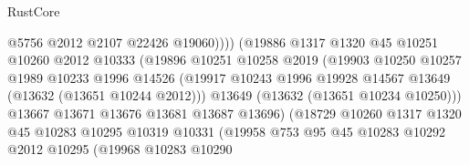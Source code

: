 \begin{lexlean}{RustCore}
\begin{coremodule}
                                        @5756
                                        @2012
                                        @2107
                                        @22426
                                        @19060))))
                                (@19886
                                  @1317
                                  @1320
                                  @45
                                  @10251
                                  @10260
                                  @2012
                                  @10333
                                  (@19896
                                    @10251
                                    @10258
                                    @2019
                                    (@19903
                                      @10250
                                      @10257
                                      @1989
                                      @10233
                                      @1996
                                      @14526
                                      (@19917
                                        @10243
                                        @1996
                                        @19928
                                        @14567
                                        @13649
                                        (@13632 (@13651 @10244 @2012)))
                                      @13649
                                      (@13632 (@13651 @10234 @10250)))
                                    @13667
                                    @13671
                                    @13676
                                    @13681
                                    @13687
                                    @13696)
                                  (@18729
                                    @10260
                                    @1317
                                    @1320
                                    @45
                                    @10283
                                    @10295
                                    @10319
                                    @10331
                                    (@19958
                                      @753
                                      @95
                                      @45
                                      @10283
                                      @10292
                                      @2012
                                      @10295
                                      (@19968
                                        @10283
                                        @10290

\end{coremodule}
\end{lexlean}

